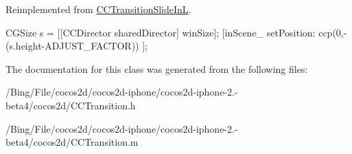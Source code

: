 Reimplemented from \hyperlink{interface_c_c_transition_slide_in_l_a1040ca9a5abc535c40d8a1a5fd23f03c}{C\-C\-Transition\-Slide\-In\-L}.


\begin{DoxyCode}
{
        CGSize s = [[CCDirector sharedDirector] winSize];
        [inScene_ setPosition: ccp(0,-(s.height-ADJUST_FACTOR)) ];
}
\end{DoxyCode}


The documentation for this class was generated from the following files\-:\begin{DoxyCompactItemize}
\item 
/\-Bing/\-File/cocos2d/cocos2d-\/iphone/cocos2d-\/iphone-\/2.-\/beta4/cocos2d/C\-C\-Transition.\-h\item 
/\-Bing/\-File/cocos2d/cocos2d-\/iphone/cocos2d-\/iphone-\/2.-\/beta4/cocos2d/C\-C\-Transition.\-m\end{DoxyCompactItemize}
